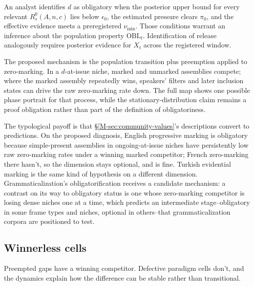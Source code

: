 An analyst identifies $d$ as obligatory when the posterior upper bound for every relevant
$R_s^0(A,n,c)$ lies below $\epsilon_0$, the estimated pressure clears $\pi_0$, and the
effective evidence meets a preregistered $\nu_{\min}$. Those conditions warrant
an inference about the population property $\mathrm{OBL}_t$. Identification of
release analogously requires posterior evidence for $X_t$ across the registered
window.

The proposed mechanism is the population transition plus preemption applied to
zero-marking. In a $d$-at-issue niche, marked and unmarked assemblies compete;
where the marked assembly repeatedly wins, speakers' filters and later inclusion
states can drive the raw zero-marking rate down. The full map shows one
possible phase portrait for that process, while the stationary-distribution
claim remains a proof obligation rather than part of the definition of
obligatoriness.

The typological payoff is that \S\ref{M-sec:community-values}'s descriptions
convert to predictions. On the proposed diagnosis, English progressive marking
is obligatory because simple-present assemblies in ongoing-at-issue niches have
persistently low raw zero-marking rates under a winning marked competitor; French
zero-marking there hasn't, so the dimension stays optional, and
 is fine. Turkish evidential marking is the
same kind of hypothesis on a different dimension. Grammaticalization's
obligatorification receives a candidate mechanism: a contrast on its way
to obligatory status is one whose zero-marking competitor is losing dense
niches one at a time, which predicts an intermediate stage--obligatory in some
frame types and niches, optional in others--that grammaticalization corpora are
positioned to test.

\subsection{Winnerless cells}
\label{sec:winnerless-cells}

Preempted gaps have a winning competitor. Defective paradigm cells don't, and
the dynamics explain how the difference can be stable rather than transitional.

